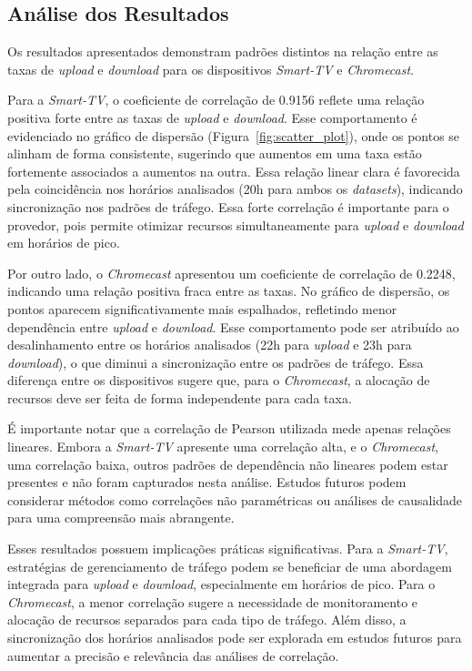 \subsection{Análise dos Resultados}

Os resultados apresentados demonstram padrões distintos na relação entre as taxas de \textit{upload} e \textit{download} para os dispositivos \textit{Smart-TV} e \textit{Chromecast}.

Para a \textit{Smart-TV}, o coeficiente de correlação de 0.9156 reflete uma relação positiva forte entre as taxas de \textit{upload} e \textit{download}. Esse comportamento é evidenciado no gráfico de dispersão (Figura~\ref{fig:scatter_plot}), onde os pontos se alinham de forma consistente, sugerindo que aumentos em uma taxa estão fortemente associados a aumentos na outra. Essa relação linear clara é favorecida pela coincidência nos horários analisados (20h para ambos os \textit{datasets}), indicando sincronização nos padrões de tráfego. Essa forte correlação é importante para o provedor, pois permite otimizar recursos simultaneamente para \textit{upload} e \textit{download} em horários de pico.

Por outro lado, o \textit{Chromecast} apresentou um coeficiente de correlação de 0.2248, indicando uma relação positiva fraca entre as taxas. No gráfico de dispersão, os pontos aparecem significativamente mais espalhados, refletindo menor dependência entre \textit{upload} e \textit{download}. Esse comportamento pode ser atribuído ao desalinhamento entre os horários analisados (22h para \textit{upload} e 23h para \textit{download}), o que diminui a sincronização entre os padrões de tráfego. Essa diferença entre os dispositivos sugere que, para o \textit{Chromecast}, a alocação de recursos deve ser feita de forma independente para cada taxa.

É importante notar que a correlação de Pearson utilizada mede apenas relações lineares. Embora a \textit{Smart-TV} apresente uma correlação alta, e o \textit{Chromecast}, uma correlação baixa, outros padrões de dependência não lineares podem estar presentes e não foram capturados nesta análise. Estudos futuros podem considerar métodos como correlações não paramétricas ou análises de causalidade para uma compreensão mais abrangente.

Esses resultados possuem implicações práticas significativas. Para a \textit{Smart-TV}, estratégias de gerenciamento de tráfego podem se beneficiar de uma abordagem integrada para \textit{upload} e \textit{download}, especialmente em horários de pico. Para o \textit{Chromecast}, a menor correlação sugere a necessidade de monitoramento e alocação de recursos separados para cada tipo de tráfego. Além disso, a sincronização dos horários analisados pode ser explorada em estudos futuros para aumentar a precisão e relevância das análises de correlação.
